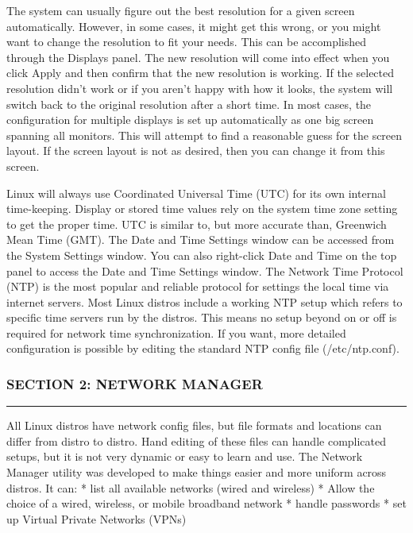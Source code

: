 The system can usually figure out the best resolution for a given screen
automatically. However, in some cases, it might get this wrong, or you
might want to change the resolution to fit your needs. This can be
accomplished through the Displays panel. The new resolution will come
into effect when you click Apply and then confirm that the new
resolution is working. If the selected resolution didn't work or if you
aren't happy with how it looks, the system will switch back to the
original resolution after a short time. In most cases, the configuration
for multiple displays is set up automatically as one big screen spanning
all monitors. This will attempt to find a reasonable guess for the
screen layout. If the screen layout is not as desired, then you can
change it from this screen.

Linux will always use Coordinated Universal Time (UTC) for its own
internal time-keeping. Display or stored time values rely on the system
time zone setting to get the proper time. UTC is similar to, but more
accurate than, Greenwich Mean Time (GMT). The Date and Time Settings
window can be accessed from the System Settings window. You can also
right-click Date and Time on the top panel to access the Date and Time
Settings window. The Network Time Protocol (NTP) is the most popular and
reliable protocol for settings the local time via internet servers. Most
Linux distros include a working NTP setup which refers to specific time
servers run by the distros. This means no setup beyond on or off is
required for network time synchronization. If you want, more detailed
configuration is possible by editing the standard NTP config file
(/etc/ntp.conf).

\subsubsection{SECTION 2: NETWORK
MANAGER}\label{section-2-network-manager}

\begin{center}\rule{3in}{0.4pt}\end{center}

All Linux distros have network config files, but file formats and
locations can differ from distro to distro. Hand editing of these files
can handle complicated setups, but it is not very dynamic or easy to
learn and use. The Network Manager utility was developed to make things
easier and more uniform across distros. It can: * list all available
networks (wired and wireless) * Allow the choice of a wired, wireless,
or mobile broadband network * handle passwords * set up Virtual Private
Networks (VPNs)

